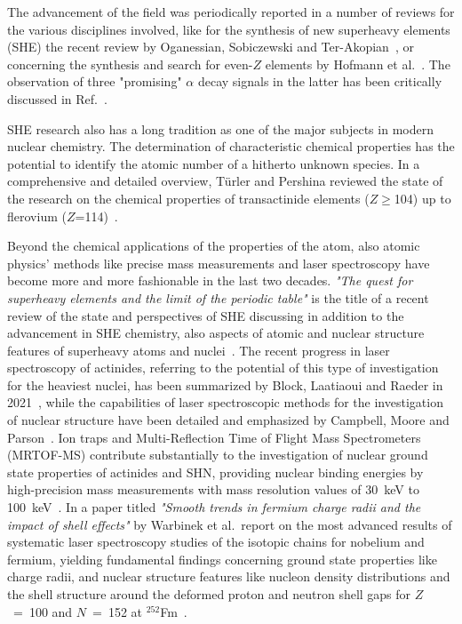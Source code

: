 The advancement of the field was periodically reported in a number of reviews for the various disciplines involved, like for the synthesis of new superheavy elements (SHE) the recent review by Oganessian, Sobiczewski and Ter-Akopian~\cite{Oganessian2017}, or concerning the synthesis and search for even-$Z$ elements by Hofmann et al.~\cite{Hofmann2016}. 
The observation of three "promising" $\alpha$ decay signals in the latter has been critically discussed in Ref.~\cite{Hessberger2017a}.
 
SHE research also has a long tradition as one of the major subjects in modern nuclear chemistry. 
The determination of characteristic chemical properties has the potential to identify the atomic number of a hitherto unknown species. 
In a comprehensive and detailed overview, T\"{u}rler and Pershina reviewed the state of the research on the chemical properties of transactinide elements ($Z\geq$104) up to flerovium ($Z$=114)~\cite{Tuerler2013}.

Beyond the chemical applications of the properties of the atom, also atomic physics' methods like precise mass measurements and laser spectroscopy have become more and more fashionable in the last two decades. 
{\it "The quest for superheavy elements and the limit of the periodic table"} is the title of a recent review of the state and perspectives of SHE discussing in addition to the advancement in SHE chemistry, also aspects of atomic and nuclear structure features of superheavy atoms and nuclei~\cite{Smits2024}.
The recent progress in laser spectroscopy of actinides, referring to the potential of this type of investigation for the heaviest nuclei, has been summarized by Block,  Laatiaoui and Raeder
in 2021~\cite{Block2021}, while the capabilities of laser spectroscopic methods for the investigation of nuclear structure have been detailed and emphasized by Campbell, Moore and Parson~\cite{Campbell2016}.
Ion traps and Multi-Reflection Time of Flight Mass Spectrometers (MRTOF-MS) contribute substantially to the investigation of nuclear ground state properties of actinides and SHN, providing nuclear binding energies by high-precision mass measurements with mass resolution values of 30~keV to 100~keV~\cite{Block2019,Block2019a}.
In a paper titled {\it "Smooth trends in fermium charge radii and the impact of shell effects"} by Warbinek et al.~report on the most advanced results of systematic laser spectroscopy studies of the isotopic chains for nobelium and fermium, yielding fundamental findings concerning ground state properties like charge radii, and nuclear structure features like nucleon density distributions and the shell structure around the deformed proton and neutron shell gaps for $Z$~=~100 and $N$~=~152 at $^{252}$Fm~\cite{Warbinek2024}.

